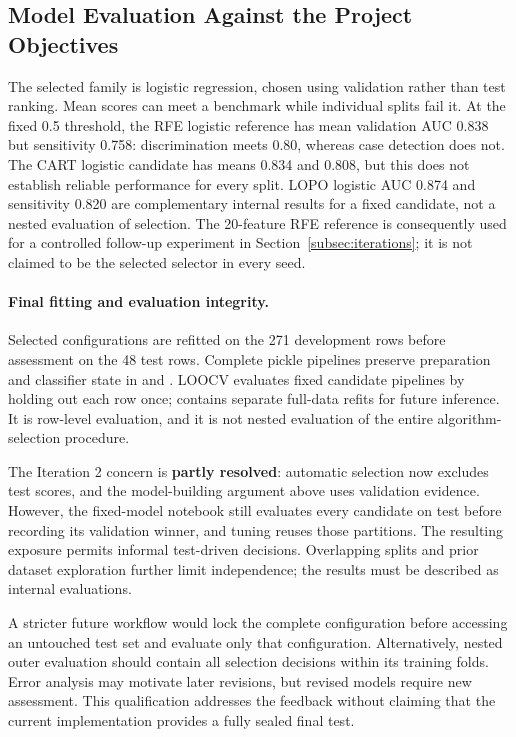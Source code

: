 \subsection{Model Evaluation Against the Project Objectives}
\label{subsec:model-evaluation}

The selected family is logistic regression, chosen using validation rather
than test ranking. Mean scores can meet a benchmark while individual splits
fail it. At the fixed 0.5 threshold, the RFE logistic reference has mean
validation AUC 0.838 but sensitivity 0.758: discrimination meets 0.80,
whereas case detection does not. The CART logistic candidate has means
0.834 and 0.808, but this does not establish reliable performance for every
split. LOPO logistic AUC 0.874 and sensitivity 0.820 are complementary
internal results for a fixed candidate, not a nested evaluation of selection.
The 20-feature RFE reference is consequently used for a controlled follow-up
experiment in Section~\ref{subsec:iterations}; it is not claimed to be the
selected selector in every seed.

\paragraph{Final fitting and evaluation integrity.}
\label{subsec:model-selection-feedback}

Selected configurations are refitted on the 271 development rows before
assessment on the 48 test rows. Complete pickle pipelines preserve preparation
and classifier state in \protect{} and \protect{}.
LOOCV evaluates fixed candidate pipelines by holding out each row once;
\protect{} contains separate full-data refits for future inference.
It is row-level evaluation, and it is not nested evaluation of the entire
algorithm-selection procedure.

The Iteration 2 concern is \textbf{partly resolved}: automatic selection now
excludes test scores, and the model-building argument above uses validation
evidence. However, the fixed-model notebook still evaluates every candidate
on test before recording its validation winner, and tuning reuses those
partitions. The resulting exposure permits informal test-driven decisions.
Overlapping splits and prior dataset exploration further limit independence;
the results must be described as internal evaluations.

A stricter future workflow would lock the complete configuration before
accessing an untouched test set and evaluate only that configuration.
Alternatively, nested outer evaluation should contain all selection decisions
within its training folds. Error analysis may motivate later revisions, but
revised models require new assessment. This qualification addresses the
feedback without claiming that the current implementation provides a fully
sealed final test.

